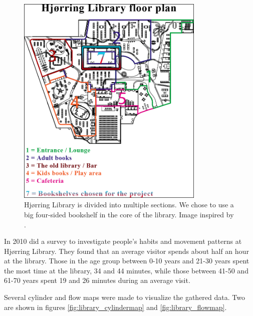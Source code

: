 \begin{figure}[htbp]
\centering
\includegraphics[width=0.80\textwidth]{Pictures/HjoerringLibrary/hjoerring_library_floorplans.png}
\caption{Hj{\o}rring Library is divided into multiple sections. We chose to use a big four-sided bookshelf in the core of the library. Image inspired by \citep{hjoerring_study}.}
\label{fig:library_floorplans}
\end{figure}


In 2010 \citep{hjoerring_study} did a survey to investigate people's habits and movement patterns at Hj{\o}rring Library. They found that an average visitor spends about half an hour at the library. Those in the age group between 0-10 years and 21-30 years spent the most time at the library, 34 and 44 minutes, while those between 41-50 and 61-70 years spent 19 and 26 minutes during an average visit.

Several cylinder and flow maps were made to visualize the gathered data. Two are shown in figures \ref{fig:library_cylindermap} and \ref{fig:library_flowmap}.

